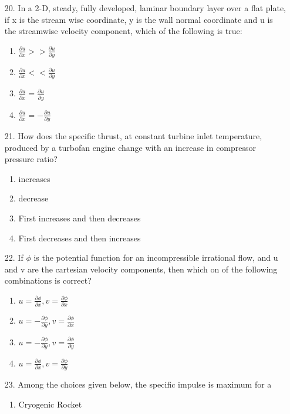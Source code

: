 \documentclass[journal]{IEEEtran}
\begin{document}
\begin{enumerate}
\begin{enumerate}[label=(\Alph*)]
 \end{enumerate}
 \item[20.] In a 2-D, steady, fully developed, laminar boundary layer over a flat plate, if x is the stream wise coordinate, y is the wall normal coordinate and u is the streamwise velocity component, which of the following is true:
 \begin{enumerate}[label=(\Alph*)]
    \item $\frac{\partial u}{\partial x}>>\frac{\partial u}{\partial y}$
    \item $\frac{\partial u}{\partial x}<<\frac{\partial u}{\partial y}$
    \item $\frac{\partial u}{\partial x}=\frac{\partial u}{\partial y}$
    \item $\frac{\partial u}{\partial x}=-\frac{\partial u}{\partial y}$
 \end{enumerate}
 \item[21.] How does the specific thrust, at constant turbine inlet temperature, produced by a turbofan engine change with an increase in compressor pressure ratio?
 \begin{enumerate}[label=(\Alph*)]
    \item increases
    \item decrease
    \item First increases and then decreases
    \item First decreases and then increases
 \end{enumerate}
 \item[22.] If $\phi$ is the potential function for an incompressible irrational flow, and u and v are the cartesian velocity components, then which on of the following combinations is correct?
 \begin{enumerate}[label=(\Alph*)]
    \item $u=\frac{\partial \phi}{\partial x}, v=\frac{\partial \phi}{\partial x}$
    \item $u=- \frac{\partial \phi}{\partial y}, v=\frac{\partial \phi}{\partial x}$
    \item $u=- \frac{\partial \phi}{\partial y}, v=\frac{\partial \phi}{\partial y}$
    \item $u=\frac{\partial \phi}{\partial x}, v=\frac{\partial \phi}{\partial y}$
 \end{enumerate}
 \item[23.] Among the choices given below, the specific impulse is maximum for a 
 \begin{enumerate}[label=(\Alph*)]
    \item Cryogenic Rocket

\end{enumerate}
\end{enumerate}
\end{document}
